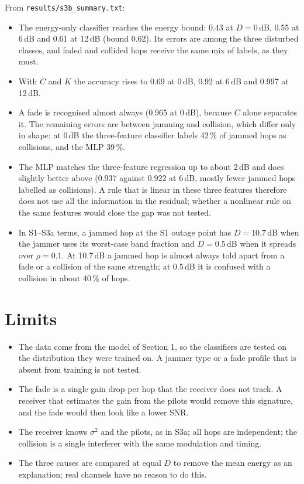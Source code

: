 \documentclass[11pt,a4paper]{article}
\begin{document}
From \texttt{results/s3b\_summary.txt}:
\begin{itemize}[nosep]
  \item The energy-only classifier reaches the energy bound: 0.43 at
        $D = 0$\,dB, 0.55 at 6\,dB and 0.61 at 12\,dB (bound 0.62). Its errors
        are among the three disturbed classes, and faded and collided hops
        receive the same mix of labels, as they must.
  \item With $C$ and $K$ the accuracy rises to 0.69 at 0\,dB, 0.92 at 6\,dB
        and 0.997 at 12\,dB.
  \item A fade is recognised almost always (0.965 at 0\,dB), because $C$ alone
        separates it. The remaining errors are between jamming and collision,
        which differ only in shape: at 0\,dB the three-feature classifier
        labels 42\,\% of jammed hops as collisions, and the MLP 39\,\%.
  \item The MLP matches the three-feature regression up to about 2\,dB and
        does slightly better above (0.937 against 0.922 at 6\,dB, mostly
        fewer jammed hops labelled as collisions). A rule that is linear in
        these three features therefore does not use all the information in the
        residual; whether a nonlinear rule on the same features would close
        the gap was not tested.
  \item In S1--S3a terms, a jammed hop at the S1 outage point has $D = 10.7$\,dB
        when the jammer uses its worst-case band fraction and $D = 0.5$\,dB
        when it spreads over $\rho = 0.1$. At 10.7\,dB a jammed hop is almost
        always told apart from a fade or a collision of the same strength; at
        0.5\,dB it is confused with a collision in about 40\,\% of hops.
\end{itemize}

\section{Limits}

\begin{itemize}[nosep]
  \item The data come from the model of Section 1, so the classifiers are
        tested on the distribution they were trained on. A jammer type or a
        fade profile that is absent from training is not tested.
  \item The fade is a single gain drop per hop that the receiver does not
        track. A receiver that estimates the gain from the pilots would remove
        this signature, and the fade would then look like a lower SNR.
  \item The receiver knows $\sigma^2$ and the pilots, as in S3a; all hops are
        independent; the collision is a single interferer with the same
        modulation and timing.
  \item The three causes are compared at equal $D$ to remove the mean energy
        as an explanation; real channels have no reason to do this.
\end{itemize}
\end{document}
